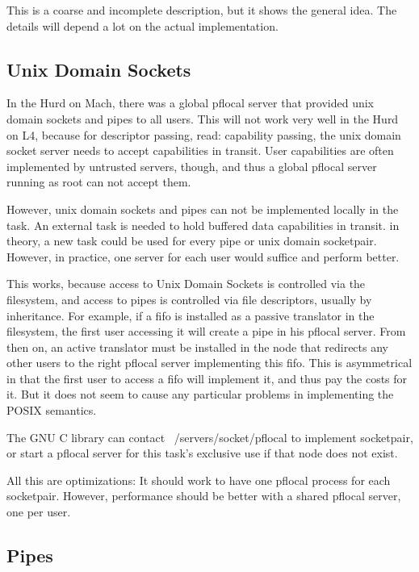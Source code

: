 \documentclass[9pt,a4paper]{extarticle}
\begin{document}
This is a coarse and incomplete description, but it shows the general
idea.  The details will depend a lot on the actual implementation.


\subsection{Unix Domain Sockets}
\label{unixdomainsockets}

In the Hurd on Mach, there was a global pflocal server that provided
unix domain sockets and pipes to all users.  This will not work very
well in the Hurd on L4, because for descriptor passing, read:
capability passing, the unix domain socket server needs to accept
capabilities in transit.  User capabilities are often implemented by
untrusted servers, though, and thus a global pflocal server running as
root can not accept them.

However, unix domain sockets and pipes can not be implemented locally
in the task.  An external task is needed to hold buffered data
capabilities in transit.  in theory, a new task could be used for
every pipe or unix domain socketpair.  However, in practice, one
server for each user would suffice and perform better.

This works, because access to Unix Domain Sockets is controlled via
the filesystem, and access to pipes is controlled via file
descriptors, usually by inheritance.  For example, if a fifo is
installed as a passive translator in the filesystem, the first user
accessing it will create a pipe in his pflocal server.  From then on,
an active translator must be installed in the node that redirects any
other users to the right pflocal server implementing this fifo.  This
is asymmetrical in that the first user to access a fifo will implement
it, and thus pay the costs for it.  But it does not seem to cause any
particular problems in implementing the POSIX semantics.

The GNU C library can contact ~/servers/socket/pflocal to implement
socketpair, or start a pflocal server for this task's exclusive use if
that node does not exist.

All this are optimizations: It should work to have one pflocal process
for each socketpair.  However, performance should be better with a
shared pflocal server, one per user.


\subsection{Pipes}
\end{document}
